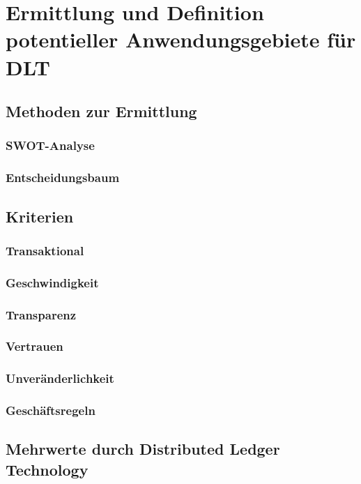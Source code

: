 \section{Ermittlung und Definition potentieller Anwendungsgebiete für DLT}

\subsection{Methoden zur Ermittlung}

\subsubsection{SWOT-Analyse}

\subsubsection{Entscheidungsbaum}

\subsection{Kriterien}

\subsubsection{Transaktional}

\subsubsection{Geschwindigkeit}

\subsubsection{Transparenz}

\subsubsection{Vertrauen}

\subsubsection{Unveränderlichkeit}

\subsubsection{Geschäftsregeln}

\subsection{Mehrwerte durch Distributed Ledger Technology}

